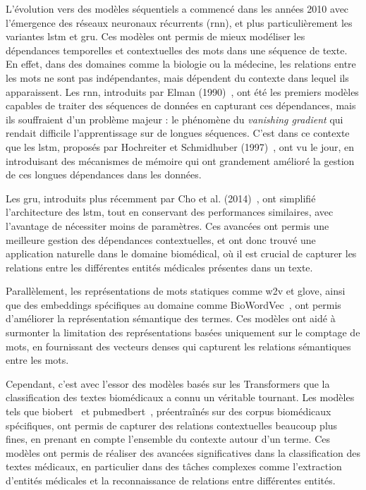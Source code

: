 \documentclass[12pt]{report}
\begin{document}
L’évolution vers des modèles séquentiels a commencé dans les années 2010 avec l'émergence des réseaux neuronaux récurrents (\gls{rnn}), et plus particulièrement les variantes \gls{lstm} et \gls{gru}. Ces modèles ont permis de mieux modéliser les dépendances temporelles et contextuelles des mots dans une séquence de texte. En effet, dans des domaines comme la biologie ou la médecine, les relations entre les mots ne sont pas indépendantes, mais dépendent du contexte dans lequel ils apparaissent. Les \gls{rnn}, introduits par Elman (1990)~\cite{elman1990finding}, ont été les premiers modèles capables de traiter des séquences de données en capturant ces dépendances, mais ils souffraient d'un problème majeur : le phénomène du \textit{vanishing gradient} qui rendait difficile l'apprentissage sur de longues séquences. C’est dans ce contexte que les \gls{lstm}, proposés par Hochreiter et Schmidhuber (1997)~\cite{hochreiter1997long}, ont vu le jour, en introduisant des mécanismes de mémoire qui ont grandement amélioré la gestion de ces longues dépendances dans les données.

Les \gls{gru}, introduits plus récemment par Cho et al. (2014)~\cite{cho2014learning}, ont simplifié l'architecture des \gls{lstm}, tout en conservant des performances similaires, avec l'avantage de nécessiter moins de paramètres. Ces avancées ont permis une meilleure gestion des dépendances contextuelles, et ont donc trouvé une application naturelle dans le domaine biomédical, où il est crucial de capturer les relations entre les différentes entités médicales présentes dans un texte.

Parallèlement, les représentations de mots statiques comme \gls{w2v} et \gls{glove}, ainsi que des embeddings spécifiques au domaine comme BioWordVec~\cite{zhang2020biowordvec}, ont permis d’améliorer la représentation sémantique des termes. Ces modèles ont aidé à surmonter la limitation des représentations basées uniquement sur le comptage de mots, en fournissant des vecteurs denses qui capturent les relations sémantiques entre les mots.

Cependant, c'est avec l'essor des modèles basés sur les Transformers que la classification des textes biomédicaux a connu un véritable tournant. Les modèles tels que \gls{biobert}~\cite{lee2020biobert} et \gls{pubmedbert}~\cite{gupta2021pubmedbert}, préentraînés sur des corpus biomédicaux spécifiques, ont permis de capturer des relations contextuelles beaucoup plus fines, en prenant en compte l’ensemble du contexte autour d’un terme. Ces modèles ont permis de réaliser des avancées significatives dans la classification des textes médicaux, en particulier dans des tâches complexes comme l'extraction d'entités médicales et la reconnaissance de relations entre différentes entités.
\end{document}
